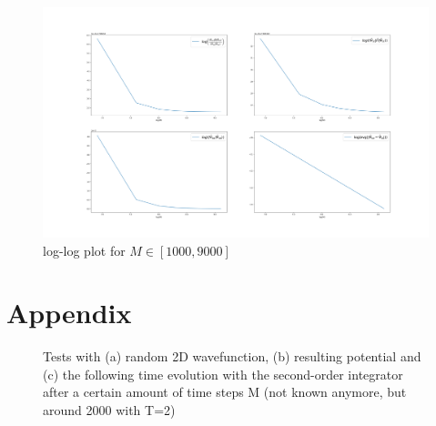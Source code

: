 \documentclass[11pt, letterpaper, onecolumn]{article}
\begin{document}
\begin{figure}[!h]
    \centering
    \includegraphics[width=.9\textwidth]{plots_for_1000M9000.png}
    \caption{log-log plot for $M\in[1000, 9000]$ }
\end{figure}\noindent\newline





\section{Appendix} \label{sec:appendix}

	\begin{figure}[h]	
	\begin{center}	
	\caption{Tests with (a) random 2D wavefunction, (b) resulting potential and (c) the following time evolution with the second-order integrator after a certain amount of time steps M (not known anymore, but around 2000 with T=2)}
	\label{fig:2D-so_integr}
	\end{center} 
	\end{figure}
	
\end{document}
